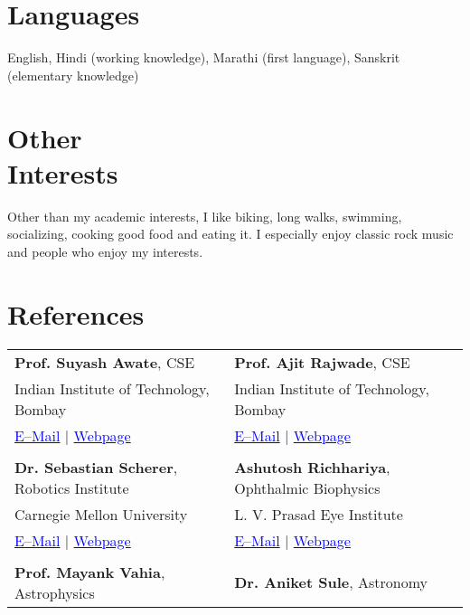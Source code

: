 \documentclass[margin,line]{res}
\begin{document}
\begin{resume}
\section{\sc Languages}
English, Hindi (working knowledge), Marathi (first language), Sanskrit (elementary knowledge)

\section{\sc Other \\Interests}
Other than my academic interests, I like biking, long walks, swimming, socializing, cooking good food and eating it. I especially enjoy classic rock music and people who enjoy my interests.

\section{\sc References} 
\begin{tabular}{@{}p{3in}p{3in}}
\textbf{Prof. Suyash Awate}, CSE & \textbf{Prof. Ajit Rajwade}, CSE \\ 
Indian Institute of Technology, Bombay & Indian Institute of Technology, Bombay \\
\href{mailto:suyash@cse.iitb.ac.in}{\textcolor{blue}{E--Mail}} $|$ \href{https://www.cse.iitb.ac.in/~suyash}{\textcolor{blue}{Webpage}} & \href{mailto:ajitvr@cse.iitb.ac.in}{\textcolor{blue}{E--Mail}} $|$ \href{https://www.cse.iitb.ac.in/~ajitvr}{\textcolor{blue}{Webpage}} \\
\vspace{1pt} & \vspace{1pt} \\
\textbf{Dr. Sebastian Scherer}, Robotics Institute & \textbf{Ashutosh Richhariya}, Ophthalmic Biophysics \\ 
Carnegie Mellon University & L. V. Prasad Eye Institute \\
\href{mailto:basti@andrew.cmu.edu}{\textcolor{blue}{E--Mail}} $|$ \href{http://www.ri.cmu.edu/person.html?person_id=1397}{\textcolor{blue}{Webpage}} & \href{mailto:ashutosh@lvpei.org}{\textcolor{blue}{E--Mail}} $|$ \href{http://www.lvpei.org/our-team/our-team-ashutosh.php}{\textcolor{blue}{Webpage}} \\
\vspace{1pt} & \vspace{1pt} \\
\textbf{Prof. Mayank Vahia}, Astrophysics & \textbf{Dr. Aniket Sule}, Astronomy \\ 

\end{tabular}
\end{resume}
\end{document}
